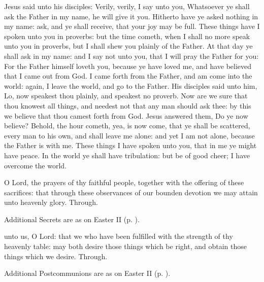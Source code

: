  Jesus said unto his disciples: Verily, verily, I say unto you, Whatsoever ye shall ask the Father in my name, he will give it you. Hitherto have ye asked nothing in my name: ask, and ye shall receive, that your joy may be full. These things have I spoken unto you in proverbs: but the time cometh, when I shall no more speak unto you in proverbs, but I shall shew you plainly of the Father. At that day ye shall ask in my name: and I say not unto you, that I will pray the Father for you: For the Father himself loveth you, because ye have loved me, and have believed that I came out from God. I came forth from the Father, and am come into the world: again, I leave the world, and go to the Father. His disciples said unto him, Lo, now speakest thou plainly, and speakest no proverb. Now are we sure that thou knowest all things, and needest not that any man should ask thee: by this we believe that thou camest forth from God. Jesus answered them, Do ye now believe? Behold, the hour cometh, yea, is now come, that ye shall be scattered, every man to his own, and shall leave me alone: and yet I am not alone, because the Father is with me. These things I have spoken unto you, that in me ye might have peace. In the world ye shall have tribulation: but be of good cheer; I have overcome the world.

\secret
{} O Lord, the prayers of thy faithful people, together with the offering of these sacrifices: that through these observances of our bounden devotion we may attain unto heavenly glory. Through.
\begin{rubric}
    Additional Secrets are as on Easter II (p. \pageref{EasterIISecret}).
\end{rubric}
\postcommunion
{} unto us, O Lord: that we who have been fulfilled with the strength of thy heavenly table: may both desire those things which be right, and obtain those things which we desire. Through.
\begin{rubric}
    Additional Postcommunions are as on Easter II (p. \pageref{EasterIIPostcommunion}).
\end{rubric}

